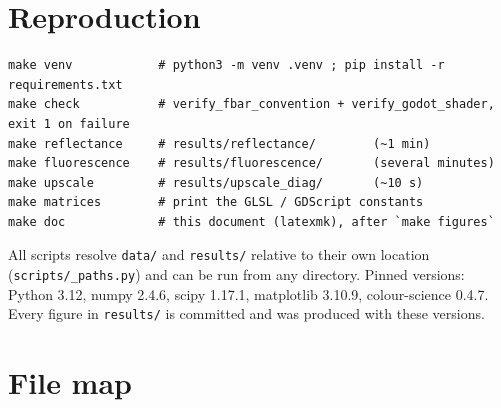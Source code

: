 \documentclass[11pt,a4paper]{article}
\newcommand{\file}[1]{\texttt{#1}}
\begin{document}
\section{Reproduction}
\label{sec:repro}

\begin{verbatim}
make venv            # python3 -m venv .venv ; pip install -r requirements.txt
make check           # verify_fbar_convention + verify_godot_shader, exit 1 on failure
make reflectance     # results/reflectance/        (~1 min)
make fluorescence    # results/fluorescence/       (several minutes)
make upscale         # results/upscale_diag/       (~10 s)
make matrices        # print the GLSL / GDScript constants
make doc             # this document (latexmk), after `make figures`
\end{verbatim}

All scripts resolve \file{data/} and \file{results/} relative to their own
location (\file{scripts/\_paths.py}) and can be run from any directory.  Pinned
versions: Python 3.12, numpy 2.4.6, scipy 1.17.1, matplotlib 3.10.9,
colour-science 0.4.7.  Every figure in \file{results/} is committed and was
produced with these versions.

\appendix
\section{File map}
\end{document}
